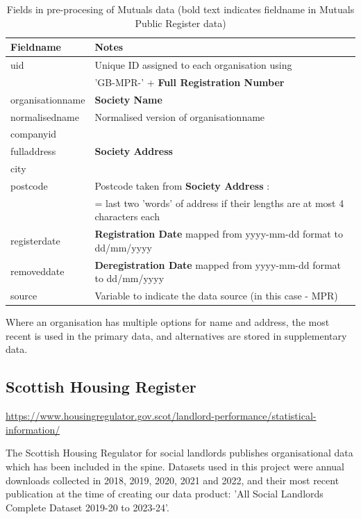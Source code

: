 \documentclass{article}
\begin{document}
\begin{table}[h]
  \centering
  \begin{tabularx}{\textwidth}{|l|X|}
    \hline
    Fieldname  &	Notes \\
    \hline \hline
uid & Unique ID assigned to each organisation using \\
&'GB-MPR-' + \textbf{Full Registration Number} \\ \hline
organisationname & \textbf{Society Name} \\ \hline
normalisedname & Normalised version of organisationname\\ \hline
companyid &  \\ \hline
fulladdress & \textbf{Society Address} \\ \hline
city & \\ \hline
postcode & Postcode taken from \textbf{Society Address} : \\ 
&  = last two 'words' of address if their lengths are at most 4 characters each\\ \hline
registerdate & \textbf{Registration Date} mapped from yyyy-mm-dd format to dd/mm/yyyy\\ \hline
removeddate & \textbf{Deregistration Date} mapped from yyyy-mm-dd format to dd/mm/yyyy\\ \hline
source & Variable to indicate the data source (in this case - MPR) \\ \hline
\hline 
\end{tabularx}
  \caption{Fields in pre-procesing of Mutuals data (bold text indicates fieldname in Mutuals Public Register data)}
  \label{tab:mpr_preprocess}
  
\end{table}

Where an organisation has multiple options for name and address, the most recent
is used in the primary data, and alternatives are stored in supplementary data.


\clearpage
\subsection{Scottish Housing Register }
\url{https://www.housingregulator.gov.scot/landlord-performance/statistical-information/}

The Scottish Housing Regulator for social landlords publishes organisational data which has been included in the spine.
Datasets used in this project were annual downloads collected in 2018, 2019, 2020, 2021 and 2022, and their most recent publication at the time
of creating our data product: 'All Social Landlords Complete Dataset 2019-20 to 2023-24'.
\end{document}
